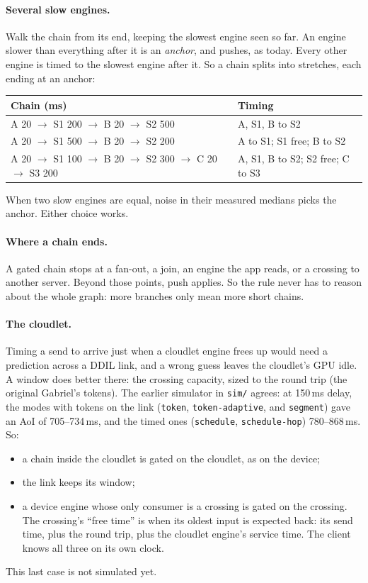 \documentclass[11pt]{article}
\newcommand{\code}[1]{\texttt{#1}}
\begin{document}
\paragraph{Several slow engines.} Walk the chain from its end, keeping the
slowest engine seen so far. An engine slower than everything after it is an
\emph{anchor}, and pushes, as today. Every other engine is timed to the slowest
engine after it. So a chain splits into stretches, each ending at an anchor:
\begin{center}
\small
\begin{tabular}{@{}ll@{}}
\toprule
Chain (ms) & Timing \\
\midrule
A 20 $\to$ S1 200 $\to$ B 20 $\to$ S2 500 & A, S1, B to S2 \\
A 20 $\to$ S1 500 $\to$ B 20 $\to$ S2 200 & A to S1; S1 free; B to S2 \\
A 20 $\to$ S1 100 $\to$ B 20 $\to$ S2 300 $\to$ C 20 $\to$ S3 200 &
  A, S1, B to S2; S2 free; C to S3 \\
\bottomrule
\end{tabular}
\end{center}
When two slow engines are equal, noise in their measured medians picks the
anchor. Either choice works.

\paragraph{Where a chain ends.} A gated chain stops at a fan-out, a join, an
engine the app reads, or a crossing to another server. Beyond those points,
push applies. So the rule never has to reason about the whole graph:
more branches only mean more short chains.

\paragraph{The cloudlet.} Timing a send to arrive just when a cloudlet
engine frees up would need a prediction across a DDIL link, and a wrong
guess leaves the cloudlet's GPU idle. A window does better there: the
crossing capacity, sized to the round trip (the original Gabriel's tokens).
The earlier simulator in \code{sim/} agrees: at 150\,ms delay, the modes
with tokens on the link (\code{token}, \code{token-adaptive}, and
\code{segment}) gave an AoI of 705--734\,ms, and the timed ones
(\code{schedule}, \code{schedule-hop}) 780--868\,ms. So:
\begin{itemize}[nosep]
  \item a chain inside the cloudlet is gated on the cloudlet, as on the
        device;
  \item the link keeps its window;
  \item a device engine whose only consumer is a crossing is gated on the
        crossing. The crossing's ``free time'' is when its oldest input is
        expected back: its send time, plus the round trip, plus the cloudlet
        engine's service time. The client knows all three on its own clock.
\end{itemize}
This last case is not simulated yet.
\end{document}
